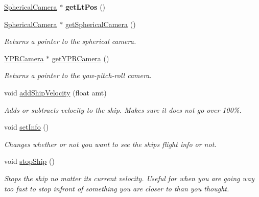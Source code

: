 \begin{DoxyCompactItemize}
\hyperlink{class_spherical_camera}{Spherical\+Camera} $\ast$ {\bfseries get\+Lt\+Pos} ()
\item 
\mbox{\label{class_graphics_engine_a08fa5ea5485b0bab2d902dd71ac995d9}} 
\hyperlink{class_spherical_camera}{Spherical\+Camera} $\ast$ \hyperlink{class_graphics_engine_a08fa5ea5485b0bab2d902dd71ac995d9}{get\+Spherical\+Camera} ()
\begin{DoxyCompactList}\small\item\em Returns a pointer to the spherical camera. \end{DoxyCompactList}\item 
\mbox{\label{class_graphics_engine_a99c1b6f36ce3c8e02cba2a97b08eab05}} 
\hyperlink{class_y_p_r_camera}{Y\+P\+R\+Camera} $\ast$ \hyperlink{class_graphics_engine_a99c1b6f36ce3c8e02cba2a97b08eab05}{get\+Y\+P\+R\+Camera} ()
\begin{DoxyCompactList}\small\item\em Returns a pointer to the yaw-\/pitch-\/roll camera. \end{DoxyCompactList}\item 
void \hyperlink{class_graphics_engine_a6c66ec6d03e94e31a3d9c2f7247e1f28}{add\+Ship\+Velocity} (float amt)
\begin{DoxyCompactList}\small\item\em Adds or subtracts velocity to the ship. Makes sure it does not go over 100\%. \end{DoxyCompactList}\item 
\mbox{\label{class_graphics_engine_a8273774fc6ed6cb1e5d52a2800f77735}} 
void \hyperlink{class_graphics_engine_a8273774fc6ed6cb1e5d52a2800f77735}{set\+Info} ()
\begin{DoxyCompactList}\small\item\em Changes whether or not you want to see the ship\textquotesingle{}s flight info or not. \end{DoxyCompactList}\item 
\mbox{\label{class_graphics_engine_ad102581ab1f4bb1a4cbb7837c8b70ea8}} 
void \hyperlink{class_graphics_engine_ad102581ab1f4bb1a4cbb7837c8b70ea8}{stop\+Ship} ()
\begin{DoxyCompactList}\small\item\em Stops the ship no matter it\textquotesingle{}s current velocity. Useful for when you are going way too fast to stop infront of something you are closer to than you thought. \end{DoxyCompactList}\item 

\end{DoxyCompactItemize}
